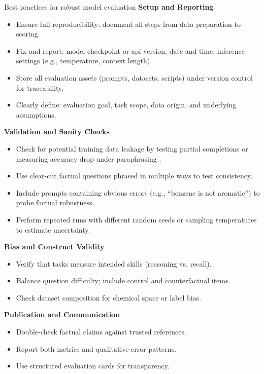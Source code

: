 \begin{examplebox}[label={example:best_practices}]{Best practices for robust model evaluation}
\textbf{Setup and Reporting}
\begin{itemize}
    \item Ensure full reproducibility: document all steps from data preparation to scoring.
    \item Fix and report: model checkpoint or \gls{api} version, date and time, inference settings (e.g., temperature, context length).
    \item Store all evaluation assets (prompts, datasets, scripts) under version control for traceability.
    \item Clearly define: evaluation goal, task scope, data origin, and underlying assumptions.
\end{itemize}

\textbf{Validation and Sanity Checks}
\begin{itemize}
    \item Check for potential training data leakage by testing partial completions or measuring accuracy drop under paraphrasing \autocite{duarte2024detecting}.
    \item Use clear-cut factual questions phrased in multiple ways to test consistency.
    \item Include prompts containing obvious errors (e.g., “benzene is not aromatic”) to probe factual robustness.
    \item Perform repeated runs with different random seeds or sampling temperatures to estimate uncertainty.
\end{itemize}


\textbf{Bias and Construct Validity}
\begin{itemize}
    \item Verify that tasks measure intended skills (reasoning vs. recall).
    \item Balance question difficulty; include control and counterfactual items.
    \item Check dataset composition for chemical space or label bias.
\end{itemize}

\textbf{Publication and Communication}
\begin{itemize}
    \item Double-check factual claims against trusted references.
    \item Report both metrics and qualitative error patterns.
    \item Use structured evaluation cards \autocite{alampara2025lessons} for transparency.
\end{itemize}
\end{examplebox}




